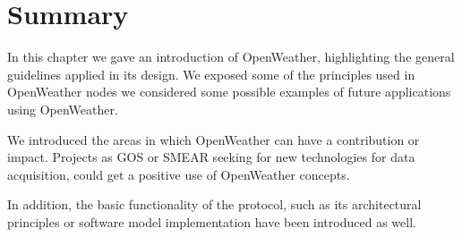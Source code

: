 \section{Summary}

In this chapter we gave an introduction of OpenWeather, highlighting the general guidelines applied in its design. We exposed some of the principles used in OpenWeather nodes we considered some possible examples of future applications using OpenWeather. 

We introduced the areas in which OpenWeather can have a contribution or impact. Projects as \gls{GOS} or SMEAR\cite{SMEAR} seeking for new technologies for data acquisition, could get a positive use of OpenWeather concepts.

In addition, the basic functionality of the protocol, such as its architectural principles or software model implementation have been introduced as well.

\pagebreak

